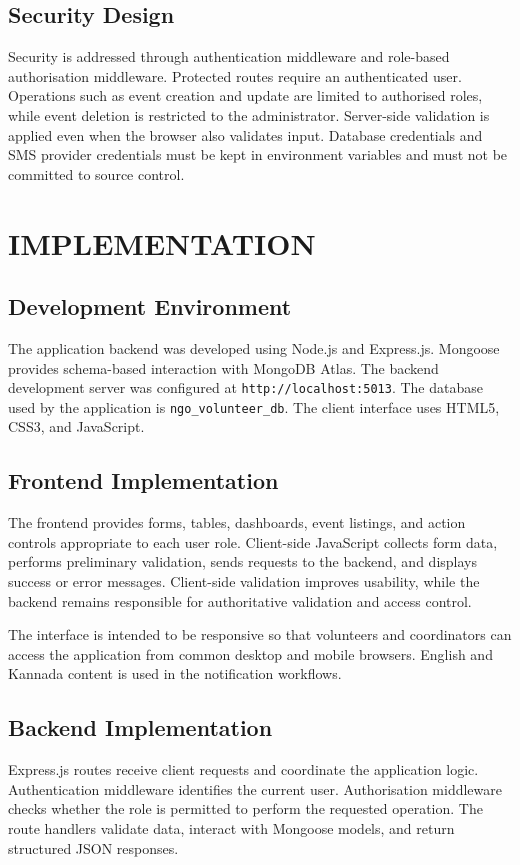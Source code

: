 \documentclass[12pt,a4paper,oneside]{report}
\begin{document}
\section{Security Design}
Security is addressed through authentication middleware and role-based authorisation middleware. Protected routes require an authenticated user. Operations such as event creation and update are limited to authorised roles, while event deletion is restricted to the administrator. Server-side validation is applied even when the browser also validates input. Database credentials and SMS provider credentials must be kept in environment variables and must not be committed to source control.

\chapter{IMPLEMENTATION}

\section{Development Environment}
The application backend was developed using Node.js and Express.js. Mongoose provides schema-based interaction with MongoDB Atlas. The backend development server was configured at \texttt{http://localhost:5013}. The database used by the application is \texttt{ngo\_volunteer\_db}. The client interface uses HTML5, CSS3, and JavaScript.

\section{Frontend Implementation}
The frontend provides forms, tables, dashboards, event listings, and action controls appropriate to each user role. Client-side JavaScript collects form data, performs preliminary validation, sends requests to the backend, and displays success or error messages. Client-side validation improves usability, while the backend remains responsible for authoritative validation and access control.

The interface is intended to be responsive so that volunteers and coordinators can access the application from common desktop and mobile browsers. English and Kannada content is used in the notification workflows.

\section{Backend Implementation}
Express.js routes receive client requests and coordinate the application logic. Authentication middleware identifies the current user. Authorisation middleware checks whether the role is permitted to perform the requested operation. The route handlers validate data, interact with Mongoose models, and return structured JSON responses.
\end{document}
